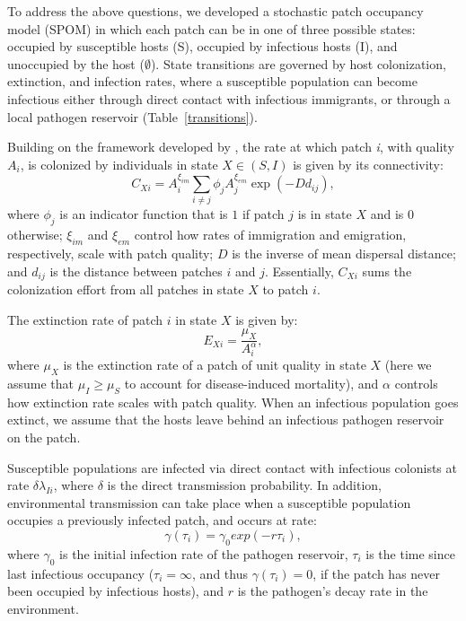 \documentclass{svjour3}
\begin{document}
To address the above questions, we developed a stochastic patch occupancy model (SPOM) in which each patch can be in one of three possible states: occupied by susceptible hosts (S), occupied by infectious hosts (I), and unoccupied by the host ($\emptyset$).  State transitions are governed by host colonization, extinction, and infection rates, where a susceptible population can become infectious either through direct contact with infectious immigrants, or through a local pathogen reservoir (Table~\ref{transitions}).

Building on the framework developed by \cite{Hanski2003}, the rate at which patch \emph{i}, with quality $A_i$, is colonized by individuals in state $X \in (S,I)$ is given by its connectivity:
\begin{equation}
C_{Xi}=A_i^{\xi_{im}} \sum_{i\neq j }\phi_jA_j^{\xi_{em}}\exp(-D d_{ij}),
\label{connectivity}
\end{equation}
where $\phi_j$ is an indicator function that is $1$ if patch $j$ is in state $X$ and is $0$ otherwise; $\xi_{im}$ and $\xi_{em}$ control how rates of immigration and emigration, respectively, scale with patch quality; $D$ is the inverse of mean dispersal distance; and $d_{ij}$ is the distance between patches $i$ and $j$.  Essentially, $C_{Xi}$ sums the colonization effort from all patches in state $X$ to patch $i$.  

The extinction rate of patch $i$ in state $X$ is given by:
\begin{equation}
E_{Xi}=\frac{\mu_X}{A_i^\alpha},
\end{equation}
where $\mu_X$ is the extinction rate of a patch of unit quality in state $X$ (here we assume that $\mu_I \geq \mu_S$ to account for disease-induced mortality), and $\alpha$ controls how extinction rate scales with patch quality.  When an infectious population goes extinct, we assume that the hosts leave behind an infectious pathogen reservoir on the patch.  

Susceptible populations are infected via direct contact with infectious colonists at rate $\delta \lambda_{Ii}$, where $\delta$ is the direct transmission probability.  In addition, environmental transmission can take place when a susceptible population occupies a previously infected patch, and occurs at rate:
\begin{equation}
\gamma(\tau_i)=\gamma_0exp(-r\tau_{i}),
\end{equation}
where $\gamma_0$ is the initial infection rate of the pathogen reservoir, $\tau_{i}$ is the time since last infectious occupancy ($\tau_{i} = \infty$, and thus $\gamma(\tau_i) = 0$, if the patch has never been occupied by infectious hosts), and $r$ is the pathogen's decay rate in the environment.
\end{document}
